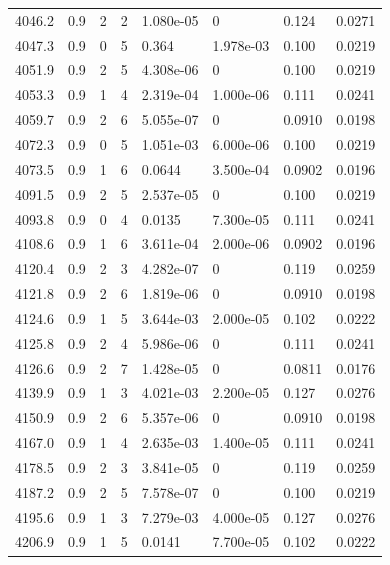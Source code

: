 \documentclass[preview]{standalone}
\begin{document}
{{{{{{{{{{\begin{tabular}{L{1.2cm}C{1.2cm} C{0.3cm}C{0.5cm} C{1.4cm}C{1.4cm} C{1.4cm}C{1.4cm}}
  4046.2  &   0.9  & 2     &  2 &  1.080e-05  & 0  & 0.124 &  0.0271   \\ 
  4047.3  &   0.9  & 0     &  5 &  0.364  & 1.978e-03  & 0.100 &  0.0219   \\ 
  4051.9  &   0.9  & 2     &  5 &  4.308e-06  & 0  & 0.100 &  0.0219   \\ 
  4053.3  &   0.9  & 1     &  4 &  2.319e-04  & 1.000e-06  & 0.111 &  0.0241   \\ 
  4059.7  &   0.9  & 2     &  6 &  5.055e-07  & 0  & 0.0910 &  0.0198   \\ 
  4072.3  &   0.9  & 0     &  5 &  1.051e-03  & 6.000e-06  & 0.100 &  0.0219   \\ 
  4073.5  &   0.9  & 1     &  6 &  0.0644  & 3.500e-04  & 0.0902 &  0.0196   \\ 
  4091.5  &   0.9  & 2     &  5 &  2.537e-05  & 0  & 0.100 &  0.0219   \\ 
  4093.8  &   0.9  & 0     &  4 &  0.0135  & 7.300e-05  & 0.111 &  0.0241   \\ 
  4108.6  &   0.9  & 1     &  6 &  3.611e-04  & 2.000e-06  & 0.0902 &  0.0196   \\ 
  4120.4  &   0.9  & 2     &  3 &  4.282e-07  & 0  & 0.119 &  0.0259   \\ 
  4121.8  &   0.9  & 2     &  6 &  1.819e-06  & 0  & 0.0910 &  0.0198   \\ 
  4124.6  &   0.9  & 1     &  5 &  3.644e-03  & 2.000e-05  & 0.102 &  0.0222   \\ 
  4125.8  &   0.9  & 2     &  4 &  5.986e-06  & 0  & 0.111 &  0.0241   \\ 
  4126.6  &   0.9  & 2     &  7 &  1.428e-05  & 0  & 0.0811 &  0.0176   \\ 
  4139.9  &   0.9  & 1     &  3 &  4.021e-03  & 2.200e-05  & 0.127 &  0.0276   \\ 
  4150.9  &   0.9  & 2     &  6 &  5.357e-06  & 0  & 0.0910 &  0.0198   \\ 
  4167.0  &   0.9  & 1     &  4 &  2.635e-03  & 1.400e-05  & 0.111 &  0.0241   \\ 
  4178.5  &   0.9  & 2     &  3 &  3.841e-05  & 0  & 0.119 &  0.0259   \\ 
  4187.2  &   0.9  & 2     &  5 &  7.578e-07  & 0  & 0.100 &  0.0219   \\ 
  4195.6  &   0.9  & 1     &  3 &  7.279e-03  & 4.000e-05  & 0.127 &  0.0276   \\ 
  4206.9  &   0.9  & 1     &  5 &  0.0141  & 7.700e-05  & 0.102 &  0.0222   \\ 

\end{tabular}}}}}}}}}}}
\end{document}
